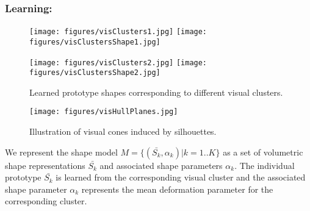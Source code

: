 \subsubsection{Learning:}
\begin{figure}[htb!]
\centering
\begin{minipage}{.45\textwidth}

  \texttt{[image: figures/visClusters1.jpg]}
  \label{fig:VisCluster1}
\quad
  \texttt{[image: figures/visClustersShape1.jpg]}
  \label{fig:VisShape1}

  \texttt{[image: figures/visClusters2.jpg]}
  \label{fig:VisCluster2}
\quad
  \texttt{[image: figures/visClustersShape2.jpg]}
  \label{fig:VisShape2}
\vspace{7pt}
  
\caption{Learned prototype shapes corresponding to different visual clusters.}
\label{fig:visClusterShapes}
\end{minipage}
\hspace{0.05\textwidth}
\begin{minipage}{.45\textwidth}

\centering
 \texttt{[image: figures/visHullPlanes.jpg]}
\caption{Illustration of visual cones induced by silhouettes.}
\label{fig:visHullPlanes}

\end{minipage}

\end{figure}



We represent the shape model $M = \{ (\bar{S_k},\alpha_k) | k=1..K\}$ as a set of volumetric shape representations $\bar{S_k}$ and associated shape parameters $\alpha_k$. The individual prototype $\bar{S_k}$ is learned from the corresponding visual cluster and the associated shape parameter $\alpha_k$ represents the mean deformation parameter for the corresponding cluster.


